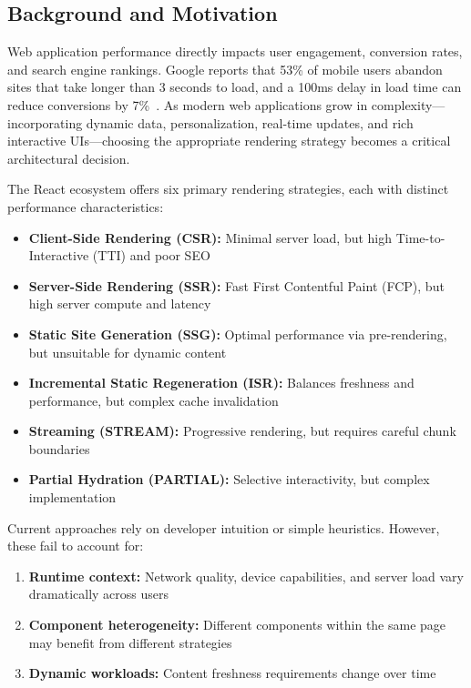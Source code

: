 \documentclass[10pt,twocolumn]{article}
\begin{document}
\subsection{Background and Motivation}

Web application performance directly impacts user engagement, conversion rates, and search engine rankings. Google reports that 53\% of mobile users abandon sites that take longer than 3 seconds to load, and a 100ms delay in load time can reduce conversions by 7\%~\cite{google2023mobile}. As modern web applications grow in complexity---incorporating dynamic data, personalization, real-time updates, and rich interactive UIs---choosing the appropriate rendering strategy becomes a critical architectural decision.

The React ecosystem offers six primary rendering strategies, each with distinct performance characteristics:

\begin{itemize}[nosep]
\item \textbf{Client-Side Rendering (CSR):} Minimal server load, but high Time-to-Interactive (TTI) and poor SEO
\item \textbf{Server-Side Rendering (SSR):} Fast First Contentful Paint (FCP), but high server compute and latency
\item \textbf{Static Site Generation (SSG):} Optimal performance via pre-rendering, but unsuitable for dynamic content
\item \textbf{Incremental Static Regeneration (ISR):} Balances freshness and performance, but complex cache invalidation
\item \textbf{Streaming (STREAM):} Progressive rendering, but requires careful chunk boundaries
\item \textbf{Partial Hydration (PARTIAL):} Selective interactivity, but complex implementation
\end{itemize}

Current approaches rely on developer intuition or simple heuristics. However, these fail to account for:

\begin{enumerate}[nosep]
\item \textbf{Runtime context:} Network quality, device capabilities, and server load vary dramatically across users
\item \textbf{Component heterogeneity:} Different components within the same page may benefit from different strategies
\item \textbf{Dynamic workloads:} Content freshness requirements change over time
\end{enumerate}
\end{document}
